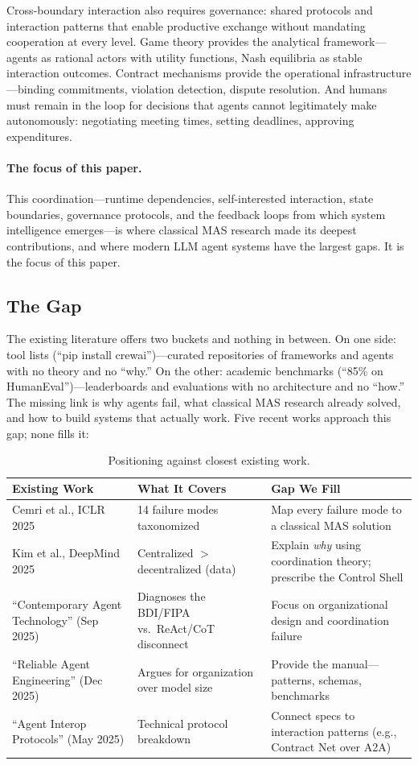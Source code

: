 \documentclass{article}
\begin{document}
Cross-boundary interaction also requires governance: shared protocols and interaction
patterns that enable productive exchange without mandating cooperation at every level.
Game theory provides the analytical framework---agents as rational actors with utility
functions, Nash equilibria as stable interaction outcomes.  Contract mechanisms provide
the operational infrastructure---binding commitments, violation detection, dispute
resolution.  And humans must remain in the loop for decisions that agents cannot
legitimately make autonomously: negotiating meeting times, setting deadlines, approving
expenditures.

\paragraph{The focus of this paper.}
This coordination---runtime dependencies, self-interested interaction, state boundaries,
governance protocols, and the feedback loops from which system intelligence
emerges---is where classical MAS research made its deepest contributions, and where
modern LLM agent systems have the largest gaps.  It is the focus of this paper.

\subsection{The Gap}
\label{sec:intro-gap}
The existing literature offers two buckets and nothing in between. On one side: tool
lists (``pip install crewai'')---curated repositories of frameworks and agents with no
theory and no ``why.'' On the other: academic benchmarks (``85\% on
HumanEval'')---leaderboards and evaluations with no architecture and no ``how.'' The
missing link is why agents fail, what classical MAS research already solved, and how to
build systems that actually work. Five recent works approach this gap; none fills it:

\begin{table}[h]
\centering
\caption{Positioning against closest existing work.}
\label{tab:positioning}
\begin{tabular}{@{} p{2.2cm} p{2.2cm} p{2.8cm} @{}}
\toprule
\textbf{Existing Work} & \textbf{What It Covers} & \textbf{Gap We Fill} \\
\midrule
Cemri et al., ICLR 2025 & 14 failure modes taxonomized & Map every failure mode to a classical MAS solution \\
Kim et al., DeepMind 2025 & Centralized $>$ decentralized (data) & Explain \emph{why} using coordination theory; prescribe the Control Shell \\
``Contemporary Agent Technology'' (Sep 2025) & Diagnoses the BDI/FIPA vs.\ ReAct/CoT disconnect & Focus on organizational design and coordination failure \\
``Reliable Agent Engineering'' (Dec 2025) & Argues for organization over model size & Provide the manual---patterns, schemas, benchmarks \\
``Agent Interop Protocols'' (May 2025) & Technical protocol breakdown & Connect specs to interaction patterns (e.g., Contract Net over A2A) \\
\bottomrule
\end{tabular}
\end{table}
\end{document}
